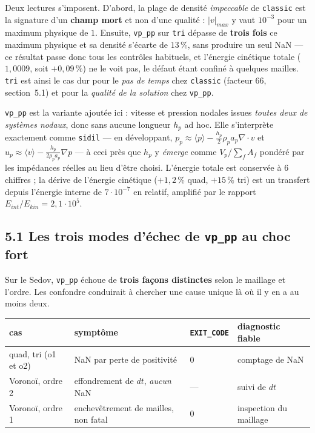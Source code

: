 \documentclass[11pt,a4paper]{article}
\begin{document}
\noindent
Deux lectures s'imposent. D'abord, la plage de densité \emph{impeccable} de
\texttt{classic} est la signature d'un \textbf{champ mort} et non d'une qualité :
$|v|_{max}$ y vaut $10^{-3}$ pour un maximum physique de $1$. Ensuite,
\texttt{vp\_pp} sur \texttt{tri} dépasse de \textbf{trois fois} ce maximum physique et
sa densité s'écarte de $13\,\%$, sans produire un seul NaN --- ce résultat passe donc
tous les contrôles habituels, et l'énergie cinétique totale ($1{,}0009$, soit
$+0{,}09\,\%$) ne le voit pas, le défaut étant confiné à quelques mailles.
\texttt{tri} est ainsi le cas dur pour le \emph{pas de temps} chez \texttt{classic}
(facteur $66$, section~5.1) et pour la \emph{qualité de la solution} chez
\texttt{vp\_pp}.

\medskip
\noindent
\texttt{vp\_pp} est la variante ajoutée ici : vitesse et pression nodales issues
\emph{toutes deux de systèmes nodaux}, donc sans aucune longueur $h_p$ ad hoc. Elle
s'interprète exactement comme \texttt{sidil} --- en développant, $p_p \approx \langle p\rangle
- \tfrac{h_p}{2}\rho_p a_p \nabla\!\cdot\!v$ et $u_p \approx \langle v\rangle -
\tfrac{h_p}{2\rho_p a_p}\nabla p$ --- à ceci près que $h_p$ y \emph{émerge} comme
$V_p/\sum_f A_f$ pondéré par les impédances réelles au lieu d'être choisi.
L'énergie totale est conservée à 6 chiffres ; la dérive de l'énergie cinétique
($+1{,}2\,\%$ quad, $+15\,\%$ tri) est un transfert depuis l'énergie interne de
$7\cdot10^{-7}$ en relatif, amplifié par le rapport $E_{int}/E_{kin}=2{,}1\cdot10^5$.

\subsection*{5.1 Les trois modes d'échec de \texttt{vp\_pp} au choc fort}

Sur le Sedov, \texttt{vp\_pp} échoue de \textbf{trois façons distinctes} selon le
maillage et l'ordre. Les confondre conduirait à chercher une cause unique là où il y
en a au moins deux.

\begin{table}[h]\centering
\begin{tabular}{llll}
\toprule
cas & symptôme & \texttt{EXIT\_CODE} & diagnostic fiable \\
\midrule
quad, tri (o1 et o2) & NaN par perte de positivité & \textcolor{BrickRed}{$0$} & comptage de NaN \\
Voronoï, ordre 2 & effondrement de $dt$, \emph{aucun} NaN & --- & suivi de $dt$ \\
Voronoï, ordre 1 & enchevêtrement de mailles, non fatal & $0$ & inspection du maillage \\
\bottomrule
\end{tabular}
\end{table}
\end{document}
